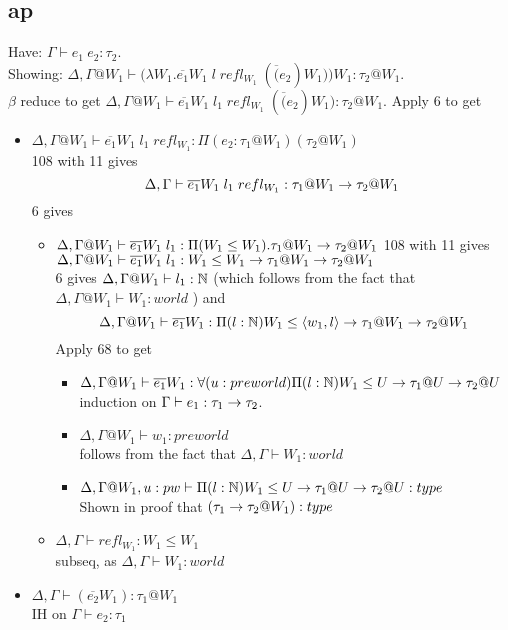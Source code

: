 \message{ !name(paper.tex)}\documentclass{article}
\begin{document}
\subsection{ap}
Have: $\Gamma \vdash e_1 \: e_2 : \tau_2$. \\
Showing: $\Delta, \Gamma@W_1 \vdash \big(\lambda W_1. \overline{e_1}W_1 \; l \; refl_{W_1} \; (\overline(e_2) W_1) \big) W_1 : \tau_2 @ W_1$. \\
$\beta$ reduce to get 
 $\Delta,\Gamma@W_1 \vdash  \overline{e_1}W_1 \; l_1 \; refl_{W_1} \; (\overline(e_2) W_1) : \tau_2 @ W_1$.
Apply 6 to get
\begin{itemize}
    \item $\Delta,\Gamma@W_1  \vdash \overline{e_1}W_1 \; l_1 \; refl_{W_1}: \Pi(e_2: \tau_1 @ W_1)(\tau_2 @ W_1)$\\
    108 with 11 gives \\
     \[\Delta,\Gamma \vdash \overline{e_1}W_1 \; l_1 \; refl_{W_1}: \tau_1 @ W_1 \rightarrow \tau_2 @ W_1\]
     6 gives 
     \begin{itemize}
         \item  $\Delta, \Gamma@W_1  \vdash \overline{e_1}W_1 \; l_1: \Pi(W_1 \leq W_1).\tau_1 @ W_1 \imp \tau_2 @ W_1$
         108 with 11 gives\\
         $\Delta,\Gamma@W_1 \vdash \overline{e_1}W_1 \; l_1: W_1 \leq W_1 \imp \tau_1 @ W_1 \imp \tau_2 @ W_1$\\
         6 gives $\Delta,\Gamma@W_1  \vdash l_1 : \N$ (which follows from the fact that $\Delta,\Gamma@W_1  \vdash W_1 : world$ ) and
        \[\Delta,\Gamma@W_1 \vdash \overline{e_1}W_1: \Pi(l : \N) W_1 \leq \langle w_1, l \rangle \imp \tau_1 @ W_1 \imp \tau_2 @ W_1\]
         Apply 68 to get
         \begin{itemize}
             \item $\Delta,\Gamma@W_1 \vdash \overline{e_1}W_1: \forall(u: preworld)\Pi(l : \N) W_1 \leq U \imp \tau_1 @U  \imp \tau_2 @ U$\\
             induction on $\Gamma \vdash e_1 : \tau_1 \rightarrow \tau_2$.
             \item $\Delta,\Gamma@W_1  \vdash w_1 : preworld$\\
             follows from the fact that $\Delta,\Gamma \vdash W_1 : world$
             \item $\Delta,\Gamma@W_1 , u : pw \vdash \Pi(l : \N) W_1 \leq U \imp \tau_1 @ U \imp \tau_2 @ U: type$\\
             Shown in proof that $(\tau_1 \rightarrow \tau_2 @ W_1) : type$
         \end{itemize}
         \item $\Delta,\Gamma \vdash refl_{W_1} : W_1 \leq W_1$\\
         subseq, as $\Delta,\Gamma \vdash  W_1 : world$
     \end{itemize}

    \item $\Delta,\Gamma \vdash (\overline{e_2} W_1) : \tau_1 @ W_1$\\
IH on $\Gamma \vdash e_2 : \tau_1$
\end{itemize}
\end{document}
